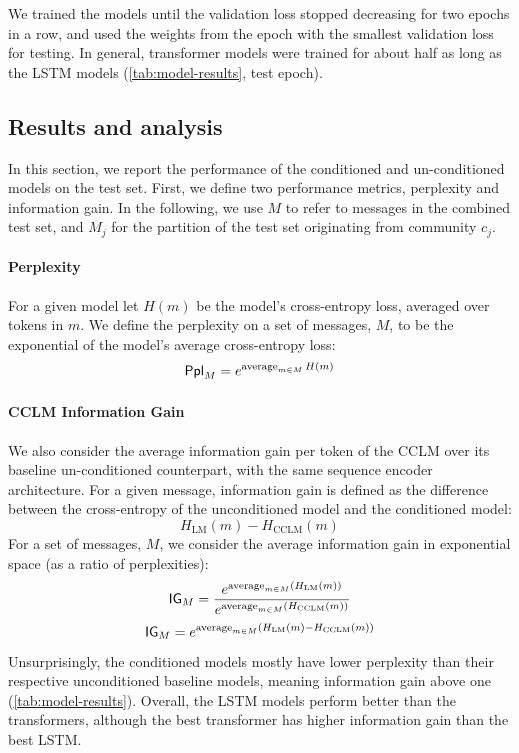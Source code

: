 \documentclass[11pt]{article}
\begin{document}
We trained the models until the validation loss stopped decreasing for
two epochs in a row, and used the weights from the epoch with the
smallest validation loss for testing.  In general, transformer models
were trained for about half as long as the LSTM models (\cref{tab:model-results}, 
test epoch).

\subsection{Results and analysis}

In this section, we report the performance of the conditioned and un-conditioned
models on the test set.
First, we define two performance metrics, perplexity and information gain.
In the following, we use $M$ to refer to messages in the
combined test set, and $M_j$ for the partition of the test set originating from 
community $c_j$.

\paragraph{Perplexity}

For a given model let $H(m)$ be the model's cross-entropy loss,
averaged over tokens in $m$.
We define the perplexity on a set of messages, $M$,
to be the exponential of the model's average cross-entropy loss:
\[\mathsf{Ppl}_M = e^{\operatorname*{average}_{m\in M} H(m)}\]

\paragraph{CCLM Information Gain}

We also consider the average information gain per token of the CCLM over its baseline
un-conditioned counterpart, with the same sequence encoder architecture.
For a given message, information gain is defined as the difference
between the cross-entropy of the unconditioned model and the conditioned model:
\[H_{\mathrm{LM}}(m) - H_{\mathrm{CCLM}}(m)\]
For a set of messages, $M$, we consider the average information gain
in exponential space (as a ratio of perplexities):
\[\mathsf{IG}_M = \frac{e^{\operatorname*{average}_{m \in M}(H_{\mathrm{LM}}(m))}}{e^{\operatorname*{average}_{m \in M}(H_{\mathrm{CCLM}}(m))}}\]
\[\mathsf{IG}_M = {e^{\operatorname*{average}_{m \in M}(H_{\mathrm{LM}}(m) - H_{\mathrm{CCLM}}(m))}}\]
%
Unsurprisingly, the conditioned models mostly have lower perplexity 
than their respective unconditioned baseline models, 
meaning information gain above one (\cref{tab:model-results}).
Overall, the LSTM models perform better than the transformers, 
although the best transformer has higher information gain than the best LSTM.
\end{document}
